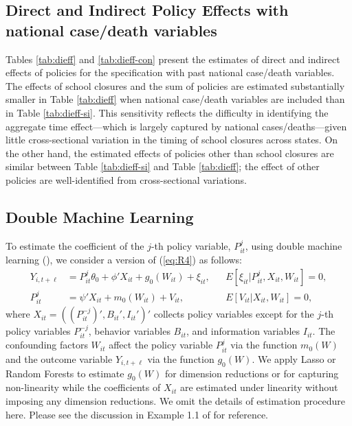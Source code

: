 \documentclass[11pt,reqno,letter]{amsart}
\theoremstyle{definition}
\begin{document}
\FloatBarrier

\subsection{Direct and Indirect Policy Effects with national case/death variables}
Tables \ref{tab:dieff} and \ref{tab:dieff-con}  present  the estimates of direct and indirect effects of policies for the specification with past national case/death variables. The effects of school closures and  the sum of policies are estimated substantially smaller in Table \ref{tab:dieff} when national case/death variables are included than in Table \ref{tab:dieff-si}. This sensitivity reflects the difficulty in identifying the aggregate time effect---which is largely captured by national cases/deaths---given little cross-sectional variation in the timing of school closures across states. On the other hand, the estimated effects of policies other than school closures are similar between Table \ref{tab:dieff-si} and Table \ref{tab:dieff}; the effect of other policies are well-identified from cross-sectional variations.



\subsection{Double Machine Learning}


To estimate the coefficient of the $j$-th policy variable, $P_{it}^j$, using double machine learning (\cite{chernozhukov18}), we consider a version of (\ref{eq:R4}) as follows:
\begin{align*}
Y_{i,t+\ell} & = P_{it}^j \theta_0 + \phi' X_{it} + g_0(W_{it}) + \xi_{it}, && E[\xi_{it}|P_{it}^j,X_{it},W_{it}]=0,\\
P_{it}^j &= \psi' X_{it} +m_0(W_{it}) +V_{it},&& E[V_{it}|X_{it},W_{it}]=0,
\end{align*}
where $X_{it}=((P_{it}^{-j})',B_{it}',I_{it}')'$ collects  policy variables except for the $j$-th policy variables $P_{it}^{-j}$, behavior variables $B_{it}$, and information variables $I_{it}$. The confounding factors $W_{it}$ affect the policy variable $P_{it}^j$ via the function $m_0(W)$ and the outcome variable $Y_{i,t+\ell}$ via the function $g_0(W)$. We apply Lasso  or  Random Forests to estimate $g_0(W)$  for dimension reductions or for capturing non-linearity while the coefficients of $X_{it}$ are estimated under linearity without imposing any dimension reductions.  We omit the details of estimation procedure here. Please see the discussion in Example 1.1 of  \cite{chernozhukov18} for reference.
\end{document}
